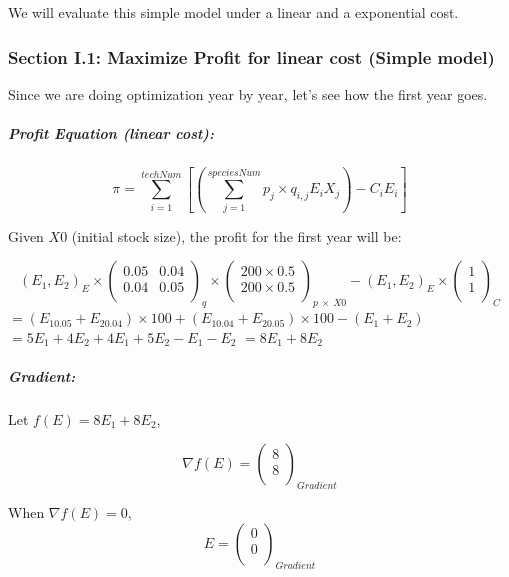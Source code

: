 \documentclass[
]{article}
\begin{document}
We will evaluate this simple model under a linear and a exponential
cost.

\hypertarget{section-i.1-maximize-profit-for-linear-cost-simple-model}{%
\subsubsection{Section I.1: Maximize Profit for linear cost (Simple
model)}\label{section-i.1-maximize-profit-for-linear-cost-simple-model}}

Since we are doing optimization year by year, let's see how the first
year goes.

\hypertarget{profit-equation-linear-cost}{%
\subparagraph{\texorpdfstring{\textbf{Profit Equation (linear
cost):}}{Profit Equation (linear cost):}}\label{profit-equation-linear-cost}}

\[\pi = \sum_{i=1}^{techNum}[(\sum_{j=1}^{speciesNum} p_j \times q_{i,j}E_iX_{j}) - C_iE_i]
\]

Given \(X0\) (initial stock size), the profit for the first year will
be:

\[
(E_1, E_2)_{E}
\times 
\begin{pmatrix}
0.05&0.04\\
0.04&0.05\\
\end{pmatrix}_q
\times 
\begin{pmatrix}
200 \times 0.5\\
200 \times 0.5\\
\end{pmatrix}_{p \ \times \ X0}
-
(E_1, E_2)_{E}
\times 
\begin{pmatrix}
1\\
1\\
\end{pmatrix}_{C}
\]
\(= (E_10.05+E_20.04)\times 100 + (E_10.04+E_20.05)\times 100 - (E_1 + E_2)\)
\(= 5E_1 + 4E_2+4E_1+5E_2-E_1-E_2\) \(= 8E_1+8E_2\)

\hypertarget{gradient}{%
\subparagraph{\texorpdfstring{\textbf{Gradient:}}{Gradient:}}\label{gradient}}

Let \(f(E) = 8E_1+8E_2\),

\[\nabla f(E) = 
\begin{pmatrix}
8\\
8\\
\end{pmatrix}_{Gradient}
\]

When \(\nabla f(E) = 0\), \[E = 
\begin{pmatrix}
0\\
0\\
\end{pmatrix}_{Gradient}
\]
\end{document}
